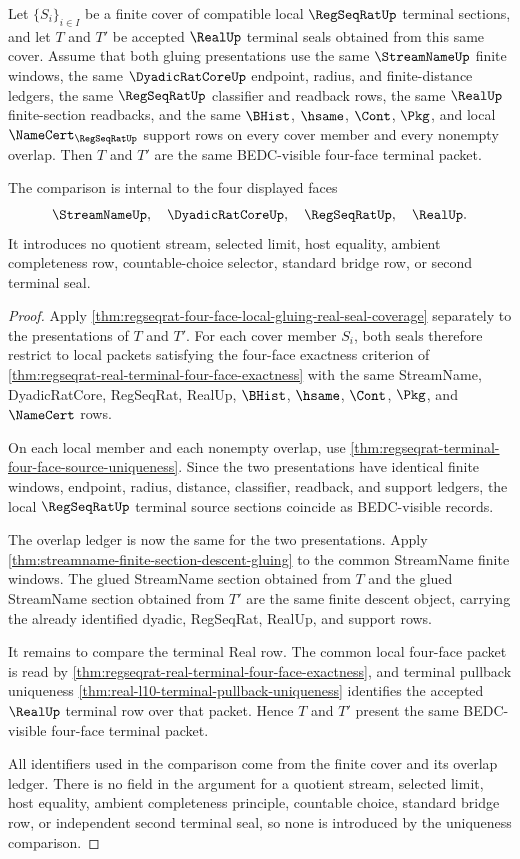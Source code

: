 \begin{theorem}
\label{thm:regseqrat-four-face-gluing-uniqueness}
Let $\{S_i\}_{i \in I}$ be a finite cover of compatible local
$\RegSeqRatUp$ terminal sections, and let $T$ and $T'$ be accepted
$\RealUp$ terminal seals obtained from this same cover. Assume that both
gluing presentations use the same $\StreamNameUp$ finite windows, the same
$\DyadicRatCoreUp$ endpoint, radius, and finite-distance ledgers, the same
$\RegSeqRatUp$ classifier and readback rows, the same $\RealUp$
finite-section readbacks, and the same $\BHist$, $\hsame$, $\Cont$, $\Pkg$,
and local $\NameCert_{\RegSeqRatUp}$ support rows on every cover member and
every nonempty overlap. Then $T$ and $T'$ are the same BEDC-visible
four-face terminal packet.

The comparison is internal to the four displayed faces
$$
\StreamNameUp,\quad \DyadicRatCoreUp,\quad \RegSeqRatUp,\quad \RealUp.
$$
It introduces no quotient stream, selected limit, host equality, ambient
completeness row, countable-choice selector, standard bridge row, or second
terminal seal.
\end{theorem}
\begin{proof}
Apply
\autoref{thm:regseqrat-four-face-local-gluing-real-seal-coverage} separately
to the presentations of $T$ and $T'$. For each cover member $S_i$, both
seals therefore restrict to local packets satisfying the four-face exactness
criterion of \autoref{thm:regseqrat-real-terminal-four-face-exactness} with
the same StreamName, DyadicRatCore, RegSeqRat, RealUp, $\BHist$, $\hsame$,
$\Cont$, $\Pkg$, and $\NameCert$ rows.

On each local member and each nonempty overlap, use
\autoref{thm:regseqrat-terminal-four-face-source-uniqueness}. Since the two
presentations have identical finite windows, endpoint, radius, distance,
classifier, readback, and support ledgers, the local $\RegSeqRatUp$ terminal
source sections coincide as BEDC-visible records.

The overlap ledger is now the same for the two presentations. Apply
\autoref{thm:streamname-finite-section-descent-gluing} to the common
StreamName finite windows. The glued StreamName section obtained from $T$
and the glued StreamName section obtained from $T'$ are the same finite
descent object, carrying the already identified dyadic, RegSeqRat, RealUp,
and support rows.

It remains to compare the terminal Real row. The common local four-face
packet is read by
\autoref{thm:regseqrat-real-terminal-four-face-exactness}, and terminal
pullback uniqueness
\autoref{thm:real-l10-terminal-pullback-uniqueness} identifies the accepted
$\RealUp$ terminal row over that packet. Hence $T$ and $T'$ present the same
BEDC-visible four-face terminal packet.

All identifiers used in the comparison come from the finite cover and its
overlap ledger. There is no field in the argument for a quotient stream,
selected limit, host equality, ambient completeness principle, countable
choice, standard bridge row, or independent second terminal seal, so none is
introduced by the uniqueness comparison.
\end{proof}

